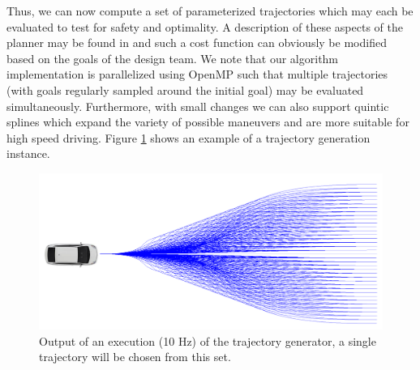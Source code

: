 	
Thus, we can now compute a set of parameterized trajectories which may each be evaluated to test for safety and optimality. A description of these aspects of the planner may be found in \cite{McNaughton_2011_6927} and such a cost function can obviously be modified based on the goals of the design team. 
We note that our algorithm implementation is parallelized using OpenMP such that multiple trajectories (with goals regularly sampled around the initial goal) may be evaluated simultaneously. Furthermore, with small changes we can also support quintic splines which expand the variety of possible maneuvers and are more suitable for high speed driving. Figure \ref{fig:traj_gen} shows an example of a trajectory generation instance.
\begin{figure}[t]
	\includegraphics[width=\columnwidth]{figures/traj_gen.png}
	\vspace{-20pt}
	\caption{Output of an execution (10 Hz) of the trajectory generator, a single trajectory will be chosen from this set.}
	\label{fig:traj_gen}
\end{figure}
